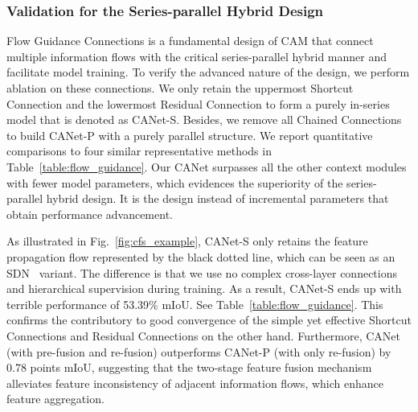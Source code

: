 \documentclass[journal]{IEEEtran}
\begin{document}
\subsubsection{Validation for the Series-parallel Hybrid Design}
Flow Guidance Connections is a fundamental design of CAM that connect multiple information flows with the critical series-parallel hybrid manner and facilitate model training. To verify the advanced nature of the design, we perform ablation on these connections. We only retain the uppermost Shortcut Connection and the lowermost Residual Connection to form a purely in-series model that is denoted as CANet-S. Besides, we remove all Chained Connections to build CANet-P with a purely parallel structure. We report quantitative comparisons to four similar representative methods in Table~\ref{table:flow_guidance}. Our CANet surpasses all the other context modules with fewer model parameters, which evidences the superiority of the series-parallel hybrid design. It is the design instead of incremental parameters that obtain performance advancement.

As illustrated in Fig.~\ref{fig:cfs_example}, CANet-S only retains the feature propagation flow represented by the black dotted line, which can be seen as an SDN~\cite{fu2019stacked} variant. The difference is that we use no complex cross-layer connections and hierarchical supervision during training. As a result, CANet-S ends up with terrible performance of 53.39\% mIoU. See Table~\ref{table:flow_guidance}. This confirms the contributory to good convergence of the simple yet effective Shortcut Connections and Residual Connections on the other hand. Furthermore, CANet (with pre-fusion and re-fusion) outperforms CANet-P (with only re-fusion) by 0.78 points mIoU, suggesting that the two-stage feature fusion mechanism alleviates feature inconsistency of adjacent information flows, which enhance feature aggregation.
\end{document}
